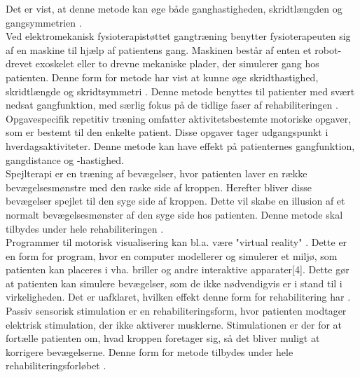 Det er vist, at denne metode kan øge både ganghastigheden, skridtlængden og gangsymmetrien \cite{Sundhedsstyrelsen2010}. \\
Ved elektromekanisk fysioterapistøttet gangtræning benytter fysioterapeuten sig af en maskine til hjælp af patientens gang. Maskinen består af enten et robot-drevet exoskelet eller to drevne mekaniske plader, der simulerer gang hos patienten. %
Denne form for metode har vist at kunne øge skridthastighed, skridtlængde og skridtsymmetri \cite{Sundhedsstyrelsen2010}. Denne metode benyttes til patienter med svært nedsat gangfunktion, med særlig fokus på de tidlige faser af rehabiliteringen \cite{Sundhedsstyrelsen2011a}. \\
Opgavespecifik repetitiv træning omfatter aktivitetsbestemte motoriske opgaver, som er bestemt til den enkelte patient. Disse opgaver tager udgangspunkt i hverdagsaktiviteter. Denne metode kan have effekt på patienternes gangfunktion, gangdistance og -hastighed. \cite{Sundhedsstyrelsen2010} \\
Spejlterapi er en træning af bevægelser, hvor patienten laver en række bevægelsesmønstre med den raske side af kroppen. Herefter bliver disse bevægelser spejlet til den syge side af kroppen. Dette vil skabe en illusion af et normalt bevægelsesmønster af den syge side hos patienten. \cite{Sundhedsstyrelsen2010} Denne metode skal tilbydes under hele rehabiliteringen \cite{Sundhedsstyrelsen2011a}. \\
Programmer til motorisk visualisering kan bl.a. være "virtual reality" \cite{Sundhedsstyrelsen2010}. Dette er en form for program, hvor en computer modellerer og simulerer et miljø, som patienten kan placeres i vha. briller og andre interaktive apparater[4]. Dette gør at patienten kan simulere bevægelser, som de ikke nødvendigvis er i stand til i virkeligheden. Det er uafklaret, hvilken effekt denne form for rehabilitering har \cite{Sundhedsstyrelsen2010}. \\
Passiv sensorisk stimulation er en rehabiliteringsform, hvor patienten modtager elektrisk stimulation, der ikke aktiverer musklerne. Stimulationen er der for at fortælle patienten om, hvad kroppen foretager sig, så det bliver muligt at korrigere bevægelserne. \cite{Sundhedsstyrelsen2010} Denne form for metode tilbydes under hele rehabiliteringsforløbet \cite{Sundhedsstyrelsen2011a}.
%
%
